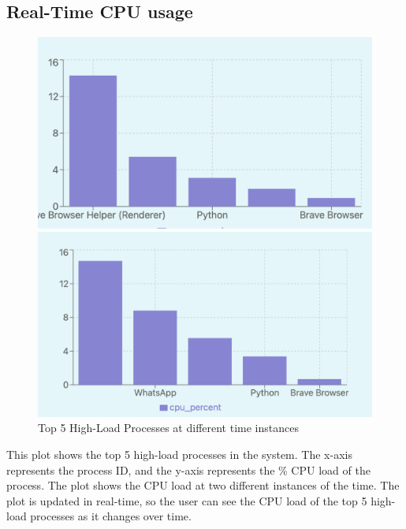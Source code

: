 \documentclass[12pt]{article}
\begin{document}
\subsection{Real-Time CPU usage}
\begin{figure}[H]
    \centering
    \begin{minipage}{0.45\textwidth}
        \centering
        \includegraphics[width=\textwidth]{logos and images/top5_1.png}
    \end{minipage}
    \hfill
    \begin{minipage}{0.45\textwidth}
        \centering
        \includegraphics[width=\textwidth]{logos and images/top5_2.png}
    \end{minipage}
    \caption{Top 5 High-Load Processes at different time instances}
\end{figure}
This plot shows the top 5 high-load processes in the system. The x-axis represents the process ID, and the y-axis represents the \% CPU load of the process. The plot shows the CPU load at two different instances of the time. The plot is updated in real-time, so the user can see the CPU load of the top 5 high-load processes as it changes over time.
\end{document}
